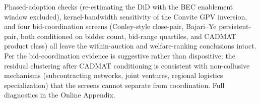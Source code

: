 Phased-adoption checks (re-estimating the DiD with the BEC enablement window excluded), kernel-bandwidth sensitivity of the Convite GPV inversion, and four bid-coordination screens (Conley-style close-pair, Bajari--Ye persistent-pair, both conditioned on bidder count, bid-range quartiles, and CADMAT product class) all leave the within-auction and welfare-ranking conclusions intact. Per \citet{conley2016, kawainakabayashi2022} the bid-coordination evidence is suggestive rather than dispositive; the residual clustering after CADMAT conditioning is consistent with non-collusive mechanisms (subcontracting networks, joint ventures, regional logistics specialization) that the screens cannot separate from coordination. Full diagnostics in the Online Appendix.


